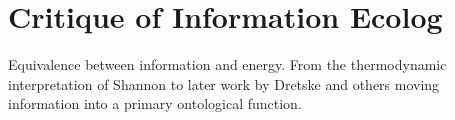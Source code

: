 \section{Critique of Information Ecolog}

Equivalence between information and energy. From the thermodynamic interpretation of Shannon to later work by Dretske and others moving information into a primary ontological function.